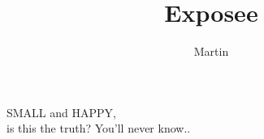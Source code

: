 \documentclass{scrreprt}
\author{Martin}
\title{Exposee}
\begin{document}
\maketitle




SMALL and HAPPY, \\

is this the truth? You'll never know..
\end{document}
